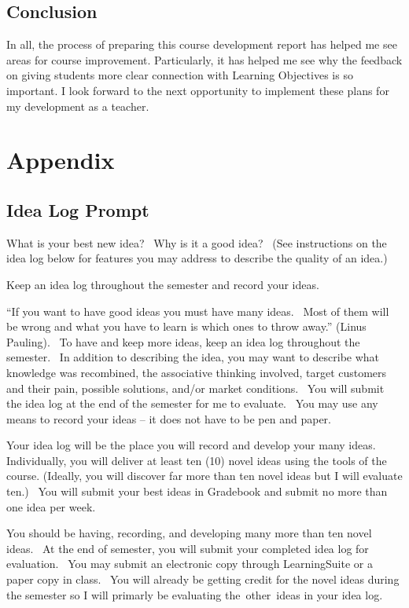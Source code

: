 \documentclass[11pt,article,oneside]{memoir}
\begin{document}
\section{Conclusion}\label{conclusion}

In all, the process of preparing this course development report has
helped me see areas for course improvement. Particularly, it has helped
me see why the feedback on giving students more clear connection with
Learning Objectives is so important. I look forward to the next
opportunity to implement these plans for my development as a teacher.

\chapter{Appendix}\label{appendix}

\section{Idea Log Prompt}\label{idea-log-prompt}

What is your best new idea?~ Why is it a good idea?~ (See instructions
on the idea log below for features you may address to describe the
quality of an idea.)

Keep an idea log throughout the semester and record your ideas.~

\enquote{If you want to have good ideas you must have many ideas.~ Most
of them will be wrong and what you have to learn is which ones to throw
away.} (Linus Pauling).~ To have and keep more ideas, keep an idea log
throughout the semester.~ In addition to describing the idea, you may
want to describe what knowledge was recombined, the associative thinking
involved, target customers and their pain, possible solutions, and/or
market conditions.~ You will submit the idea log at the end of the
semester for me to evaluate.~ You may use any means to record your ideas
-- it does not have to be pen and paper.

Your idea log will be the place you will record and develop your many
ideas.~ Individually, you will deliver at least ten (10) novel ideas
using the tools of the course. (Ideally, you will discover far more than
ten novel ideas but I will evaluate ten.)~ You will submit your best
ideas in Gradebook and submit no more than one idea per week.~

You should be having, recording, and developing many more than ten novel
ideas.~ At the end of semester, you will submit your completed idea log
for evaluation.~ You may submit an electronic copy through LearningSuite
or a paper copy in class.~ You will already be getting credit for the
novel ideas during the semester so I will primarly be evaluating
the~other~ideas in your idea log.
\end{document}
